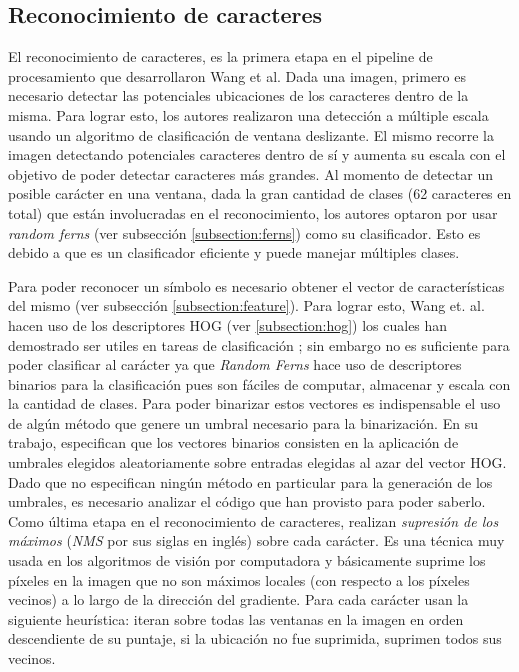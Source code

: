 \subsection{Reconocimiento de caracteres}
	
	El reconocimiento de caracteres, es la primera etapa en el pipeline de procesamiento que desarrollaron Wang et al. Dada una imagen, primero es necesario detectar las potenciales ubicaciones de los caracteres dentro de la misma. Para lograr esto, los autores realizaron una detección a múltiple escala usando un algoritmo de clasificación de ventana deslizante. El mismo recorre la imagen detectando potenciales caracteres dentro de sí y aumenta su escala con el objetivo de poder detectar caracteres más grandes. Al momento de detectar un posible carácter en una ventana, dada la gran cantidad de clases (62 caracteres en total) que están involucradas en el reconocimiento, los autores optaron por usar \textit{random ferns} (ver subsección \ref{subsection:ferns}) como su clasificador. Esto es debido a que es un clasificador eficiente y puede manejar múltiples clases.
	
	Para poder reconocer un símbolo es necesario obtener el vector de características del mismo (ver subsección \ref{subsection:feature}). Para lograr esto, Wang et. al. hacen uso de los descriptores HOG (ver \ref{subsection:hog}) los cuales han demostrado ser utiles en tareas de clasificación \cite{DT05}; sin embargo no es suficiente para poder clasificar al carácter ya que \textit{Random Ferns} hace uso de descriptores binarios para la clasificación pues son fáciles de computar, almacenar y escala con la cantidad de clases. Para poder binarizar estos vectores es indispensable el uso de algún método que genere un umbral necesario para la binarización. En su trabajo, especifican que los vectores binarios consisten en la aplicación de umbrales elegidos aleatoriamente sobre entradas elegidas al azar del vector HOG. Dado que no especifican ningún método en particular para la generación de los umbrales, es necesario analizar el código que han provisto para poder saberlo. Como última etapa en el reconocimiento de caracteres, realizan \textit{supresión de los máximos} (\textit{NMS} por sus siglas en inglés) sobre cada carácter. Es una técnica muy usada en los algoritmos de visión por computadora  y básicamente suprime los píxeles en la imagen que no son máximos locales (con respecto a los píxeles vecinos) a lo largo de la dirección del gradiente. Para cada carácter  usan la siguiente heurística: iteran sobre todas las ventanas en la imagen en orden descendiente de su puntaje, si la ubicación no fue suprimida, suprimen todos sus vecinos.
	

